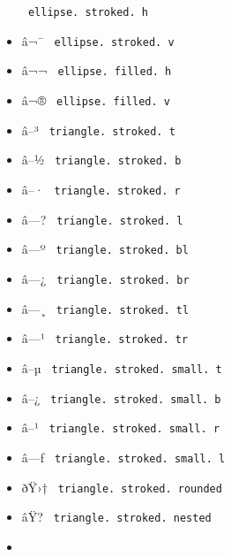 \begin{itemize}
{  \texttt{\ ellipse.\ stroked.\ h\ }}
\item
  \label{symbol-ellipse.stroked.v}{{ â¬¯ }
  \texttt{\ ellipse.\ stroked.\ v\ }}
\item
  \label{symbol-ellipse.filled.h}{{ â¬¬ }
  \texttt{\ ellipse.\ filled.\ h\ }}
\item
  \label{symbol-ellipse.filled.v}{{ â¬® }
  \texttt{\ ellipse.\ filled.\ v\ }}
\item
  \label{symbol-triangle.stroked.t}{{ â--³ }
  \texttt{\ triangle.\ stroked.\ t\ }}
\item
  \label{symbol-triangle.stroked.b}{{ â--½ }
  \texttt{\ triangle.\ stroked.\ b\ }}
\item
  \label{symbol-triangle.stroked.r}{{ â--· }
  \texttt{\ triangle.\ stroked.\ r\ }}
\item
  \label{symbol-triangle.stroked.l}{{ â---? }
  \texttt{\ triangle.\ stroked.\ l\ }}
\item
  \label{symbol-triangle.stroked.bl}{{ â---º }
  \texttt{\ triangle.\ stroked.\ bl\ }}
\item
  \label{symbol-triangle.stroked.br}{{ â---¿ }
  \texttt{\ triangle.\ stroked.\ br\ }}
\item
  \label{symbol-triangle.stroked.tl}{{ â---¸ }
  \texttt{\ triangle.\ stroked.\ tl\ }}
\item
  \label{symbol-triangle.stroked.tr}{{ â---¹ }
  \texttt{\ triangle.\ stroked.\ tr\ }}
\item
  \label{symbol-triangle.stroked.small.t}{{ â--µ }
  \texttt{\ triangle.\ stroked.\ small.\ t\ }}
\item
  \label{symbol-triangle.stroked.small.b}{{ â--¿ }
  \texttt{\ triangle.\ stroked.\ small.\ b\ }}
\item
  \label{symbol-triangle.stroked.small.r}{{ â--¹ }
  \texttt{\ triangle.\ stroked.\ small.\ r\ }}
\item
  \label{symbol-triangle.stroked.small.l}{{ â---ƒ }
  \texttt{\ triangle.\ stroked.\ small.\ l\ }}
\item
  \label{symbol-triangle.stroked.rounded}{{ ðŸ›† }
  \texttt{\ triangle.\ stroked.\ rounded\ }}
\item
  \label{symbol-triangle.stroked.nested}{{ âŸ? }
  \texttt{\ triangle.\ stroked.\ nested\ }}
\item

\end{itemize}
